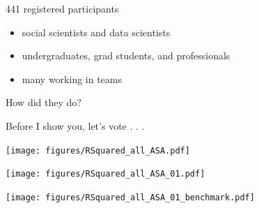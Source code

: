 \documentclass{beamer}
\begin{document}
\begin{frame}

441 registered participants
\begin{itemize}
\item social scientists and data scientists
\item undergraduates, grad students, and professionals
\item many working in teams
\end{itemize}

\end{frame}
\begin{frame}

\begin{center}
How did they do?
\end{center}

\end{frame}
\begin{frame}

Before I show you, let's vote . . .

\end{frame}
\begin{frame}

\centering
\texttt{[image: figures/RSquared\_all\_ASA.pdf]}

\end{frame}
\begin{frame}

\centering
\texttt{[image: figures/RSquared\_all\_ASA\_01.pdf]}

\end{frame}
\begin{frame}

\centering
\texttt{[image: figures/RSquared\_all\_ASA\_01\_benchmark.pdf]}

\end{frame}
\end{document}
